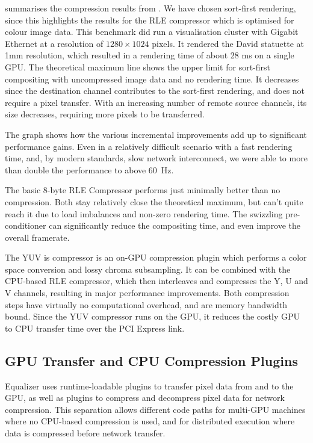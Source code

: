 summarises the compression results from \cite{MEP:10}. We have
chosen sort-first rendering, since this highlights the results for the RLE
compressor which is optimised for colour image data. This benchmark did run a
visualisation cluster with Gigabit Ethernet at a resolution of $1280\times
1024$ pixels. It rendered the David statuette at 1mm resolution, which resulted
in a rendering time of about 28 ms on a single GPU. The theoretical maximum
line shows the upper limit for sort-first compositing with uncompressed image
data and no rendering time. It decreases since the destination channel
contributes to the sort-first rendering, and does not require a pixel transfer.
With an increasing number of remote source channels, its size decreases,
requiring more pixels to be transferred.

The graph shows how the various incremental improvements add up to significant
performance gains. Even in a relatively difficult scenario with a fast
rendering time, and, by modern standards, slow network interconnect, we were
able to more than double the performance to above 60~Hz.

The basic 8-byte RLE Compressor performs just minimally better than no
compression. Both stay relatively close the theoretical maximum, but can't
quite reach it due to load imbalances and non-zero rendering time. The
swizzling pre-conditioner can significantly reduce the compositing time, and
even improve the overall framerate.

The YUV is compressor is an on-GPU compression plugin which performs a
color space conversion and lossy chroma subsampling. It can be combined with the
CPU-based RLE compressor, which then interleaves and compresses the Y, U and V
channels, resulting in major performance improvements. Both compression steps
have virtually no computational overhead, and are memory bandwidth bound. Since
the YUV compressor runs on the GPU, it reduces the costly GPU to CPU transfer
time over the PCI Express link.

\subsection{GPU Transfer and CPU Compression Plugins}

Equalizer uses runtime-loadable plugins to transfer pixel data from and to the
GPU, as well as plugins to compress and decompress pixel data for network
compression. This separation allows different code paths for multi-GPU machines
where no CPU-based compression is used, and for distributed execution where data
is compressed before network transfer.

